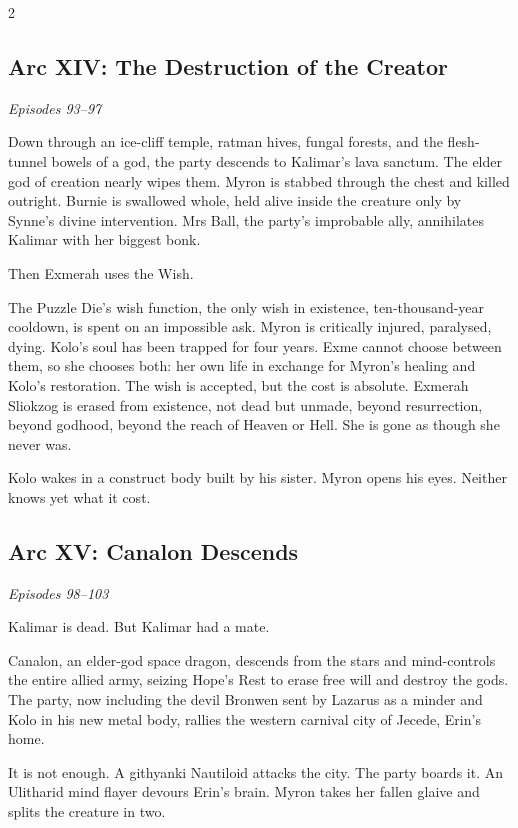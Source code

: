 \begin{multicols}{2}
\subsection*{Arc XIV: The Destruction of the Creator}
\textit{Episodes 93--97}

\medskip

\noindent
Down through an ice-cliff temple, ratman hives, fungal forests, and the flesh-tunnel bowels of a god, the party descends to Kalimar's lava sanctum.  The elder god of creation nearly wipes them.  Myron is stabbed through the chest and killed outright.  Burnie is swallowed whole, held alive inside the creature only by Synne's divine intervention.  Mrs Ball, the party's improbable ally, annihilates Kalimar with her biggest bonk.

Then Exmerah uses the Wish.

The Puzzle Die's wish function, the only wish in existence, ten-thousand-year cooldown, is spent on an impossible ask.  Myron is critically injured, paralysed, dying.  Kolo's soul has been trapped for four years.  Exme cannot choose between them, so she chooses both: her own life in exchange for Myron's healing and Kolo's restoration.  The wish is accepted, but the cost is absolute.  Exmerah Sliokzog is erased from existence, not dead but unmade, beyond resurrection, beyond godhood, beyond the reach of Heaven or Hell.  She is gone as though she never was.

Kolo wakes in a construct body built by his sister.  Myron opens his eyes.  Neither knows yet what it cost.

\subsection*{Arc XV: Canalon Descends}
\textit{Episodes 98--103}

\medskip

\noindent
Kalimar is dead.  But Kalimar had a mate.

Canalon, an elder-god space dragon, descends from the stars and mind-controls the entire allied army, seizing Hope's Rest to erase free will and destroy the gods.  The party, now including the devil Bronwen sent by Lazarus as a minder and Kolo in his new metal body, rallies the western carnival city of Jecede, Erin's home.

It is not enough.  A githyanki Nautiloid attacks the city.  The party boards it.  An Ulitharid mind flayer devours Erin's brain.  Myron takes her fallen glaive and splits the creature in two.


\end{multicols}
